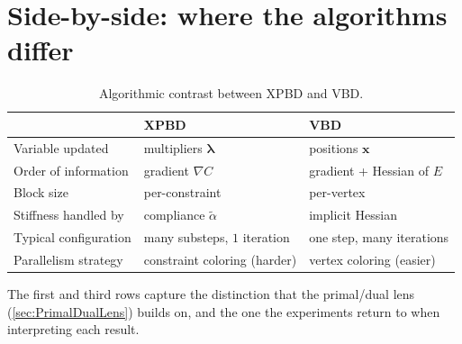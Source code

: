 \section{Side-by-side: where the algorithms differ}
\label{sec:Sidebyside}

\begin{table}[!ht]
    \footnotesize
    \centering
    \begin{tabular}{l l l}
        \toprule
                                  & XPBD                          & VBD \\
        \midrule
        Variable updated          & multipliers $\boldsymbol{\lambda}$ & positions $\mathbf{x}$ \\
        Order of information      & gradient $\nabla C$           & gradient + Hessian of $E$ \\
        Block size                & per-constraint                & per-vertex \\
        Stiffness handled by      & compliance $\tilde{\alpha}$   & implicit Hessian \\
        Typical configuration     & many substeps, $1$ iteration  & one step, many iterations \\
        Parallelism strategy      & constraint coloring (harder)  & vertex coloring (easier) \\
        \bottomrule
    \end{tabular}
    \caption{Algorithmic contrast between XPBD and VBD.}
    \label{tab:XPBDvsVBD}
\end{table}

The first and third rows capture the distinction that the primal/dual lens
(\autoref{sec:PrimalDualLens}) builds on, and the one the experiments return to
when interpreting each result.
